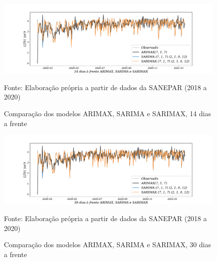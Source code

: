 \begin{figure}[H]
	\centering
	\caption{Comparação dos modelos ARIMAX, SARIMA e SARIMAX, 14 dias a frente }
	\label{fig:30-ARIMAX-SARIMA-SARIMAX24}
	\includegraphics[width=1\linewidth]{Apendices/Figuras/modelagem-24h/14-ARIMAX-SARIMA-SARIMAX}
	
Fonte: Elaboração própria a partir de dados da SANEPAR (2018 a 2020)
\end{figure}

\begin{figure}[H]
	\centering
	\caption{Comparação dos modelos ARIMAX, SARIMA e SARIMAX, 30 dias a frente }
	\label{fig:60-ARIMAX-SARIMA-SARIMAX24}
	\includegraphics[width=1\linewidth]{Apendices/Figuras/modelagem-24h/30-ARIMAX-SARIMA-SARIMAX}
	
Fonte: Elaboração própria a partir de dados da SANEPAR (2018 a 2020)
\end{figure}
